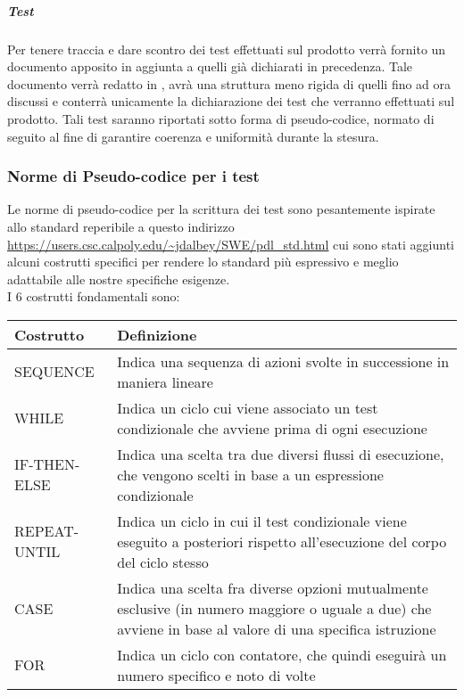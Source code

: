 	\subparagraph{Test}
	Per tenere traccia e dare scontro dei test effettuati sul prodotto verrà fornito un documento apposito in aggiunta a quelli già dichiarati in precedenza. Tale documento verrà redatto in , avrà una struttura meno rigida di quelli fino ad ora discussi e conterrà unicamente la dichiarazione dei test che verranno effettuati sul prodotto.
	Tali test saranno riportati sotto forma di pseudo-codice, normato di seguito al fine di garantire coerenza e uniformità durante la stesura.
	
	\subsubsection{Norme di Pseudo-codice per i test}
	Le norme di pseudo-codice per la scrittura dei test sono pesantemente ispirate allo standard reperibile a questo indirizzo \url{https://users.csc.calpoly.edu/~jdalbey/SWE/pdl_std.html} cui sono stati aggiunti alcuni costrutti specifici per rendere lo standard più espressivo e meglio adattabile alle nostre specifiche esigenze. \\
	I 6 costrutti fondamentali sono: \\
	\begin{table}[h]
		\begin{tabular}{|p{} | p{}|}
		\hline
		Costrutto & Definizione \\
		\hline
		SEQUENCE & Indica una sequenza di azioni svolte in successione in maniera lineare \\
		\hline
		WHILE & Indica un ciclo cui viene associato un test condizionale che avviene prima di ogni esecuzione \\ 
		\hline
		IF-THEN-ELSE & Indica una scelta tra due diversi flussi di esecuzione, che vengono scelti in base a un espressione condizionale \\
		\hline
		REPEAT-UNTIL & Indica un ciclo in cui il test condizionale viene eseguito a posteriori rispetto all'esecuzione del corpo del ciclo stesso \\
		\hline
		CASE & Indica una scelta fra diverse opzioni mutualmente esclusive (in numero maggiore o uguale a due) che avviene in base al valore di una specifica istruzione \\
		\hline
		FOR & Indica un ciclo con contatore, che quindi eseguirà un numero specifico e noto di volte \\
		\hline
		\end{tabular}
	\end{table}		
	
